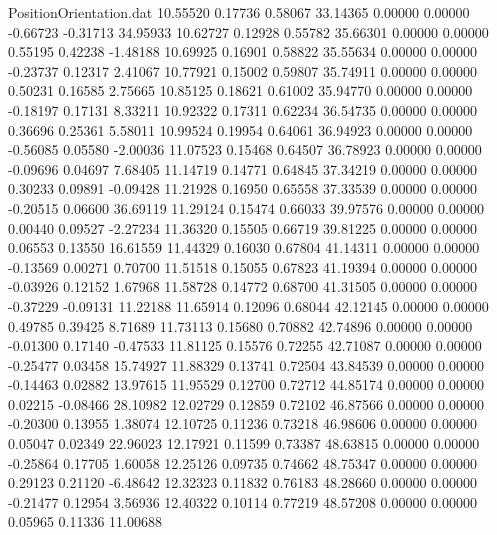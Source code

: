 \begin{filecontents}{PositionOrientation.dat}
  10.55520    0.17736    0.58067    33.14365    0.00000    0.00000   -0.66723   -0.31713   34.95933
  10.62727    0.12928    0.55782    35.66301    0.00000    0.00000    0.55195    0.42238   -1.48188
  10.69925    0.16901    0.58822    35.55634    0.00000    0.00000   -0.23737    0.12317    2.41067
  10.77921    0.15002    0.59807    35.74911    0.00000    0.00000    0.50231    0.16585    2.75665
  10.85125    0.18621    0.61002    35.94770    0.00000    0.00000   -0.18197    0.17131    8.33211
  10.92322    0.17311    0.62234    36.54735    0.00000    0.00000    0.36696    0.25361    5.58011
  10.99524    0.19954    0.64061    36.94923    0.00000    0.00000   -0.56085    0.05580   -2.00036
  11.07523    0.15468    0.64507    36.78923    0.00000    0.00000   -0.09696    0.04697    7.68405
  11.14719    0.14771    0.64845    37.34219    0.00000    0.00000    0.30233    0.09891   -0.09428
  11.21928    0.16950    0.65558    37.33539    0.00000    0.00000   -0.20515    0.06600   36.69119
  11.29124    0.15474    0.66033    39.97576    0.00000    0.00000    0.00440    0.09527   -2.27234
  11.36320    0.15505    0.66719    39.81225    0.00000    0.00000    0.06553    0.13550   16.61559
  11.44329    0.16030    0.67804    41.14311    0.00000    0.00000   -0.13569    0.00271    0.70700
  11.51518    0.15055    0.67823    41.19394    0.00000    0.00000   -0.03926    0.12152    1.67968
  11.58728    0.14772    0.68700    41.31505    0.00000    0.00000   -0.37229   -0.09131   11.22188
  11.65914    0.12096    0.68044    42.12145    0.00000    0.00000    0.49785    0.39425    8.71689
  11.73113    0.15680    0.70882    42.74896    0.00000    0.00000   -0.01300    0.17140   -0.47533
  11.81125    0.15576    0.72255    42.71087    0.00000    0.00000   -0.25477    0.03458   15.74927
  11.88329    0.13741    0.72504    43.84539    0.00000    0.00000   -0.14463    0.02882   13.97615
  11.95529    0.12700    0.72712    44.85174    0.00000    0.00000    0.02215   -0.08466   28.10982
  12.02729    0.12859    0.72102    46.87566    0.00000    0.00000   -0.20300    0.13955    1.38074
  12.10725    0.11236    0.73218    46.98606    0.00000    0.00000    0.05047    0.02349   22.96023
  12.17921    0.11599    0.73387    48.63815    0.00000    0.00000   -0.25864    0.17705    1.60058
  12.25126    0.09735    0.74662    48.75347    0.00000    0.00000    0.29123    0.21120   -6.48642
  12.32323    0.11832    0.76183    48.28660    0.00000    0.00000   -0.21477    0.12954    3.56936
  12.40322    0.10114    0.77219    48.57208    0.00000    0.00000    0.05965    0.11336   11.00688

\end{filecontents}
